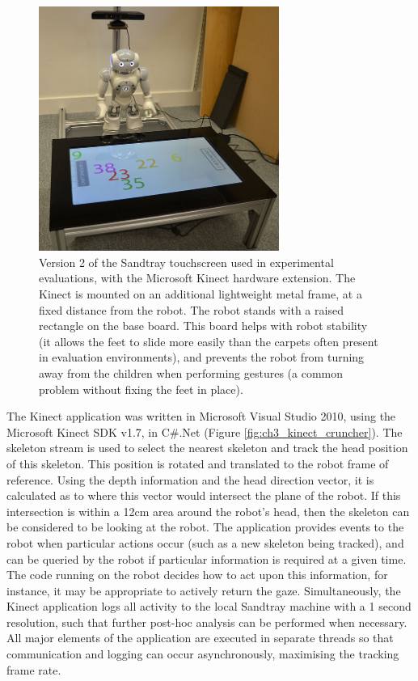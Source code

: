 \begin{figure}[ht]
   \centering
   \includegraphics[width=0.7\textwidth]{images/ch3_sandtray_kinect.jpg}
   \caption{Version 2 of the Sandtray touchscreen used in experimental evaluations, with the Microsoft Kinect hardware extension. The Kinect is mounted on an additional lightweight metal frame, at a fixed distance from the robot. The robot stands with a raised rectangle on the base board. This board helps with robot stability (it allows the feet to slide more easily than the carpets often present in evaluation environments), and prevents the robot from turning away from the children when performing gestures (a common problem without fixing the feet in place).}
   \label{fig:ch3_sandtray_kinect}
\end{figure}

The Kinect application was written in Microsoft Visual Studio 2010, using the Microsoft Kinect SDK v1.7, in C\#.Net (Figure \ref{fig:ch3_kinect_cruncher}). The skeleton stream is used to select the nearest skeleton and track the head position of this skeleton. This position is rotated and translated to the robot frame of reference. Using the depth information and the head direction vector, it is calculated as to where this vector would intersect the plane of the robot. If this intersection is within a 12cm area around the robot's head, then the skeleton can be considered to be looking at the robot. The application provides events to the robot when particular actions occur (such as a new skeleton being tracked), and can be queried by the robot if particular information is required at a given time. The code running on the robot decides how to act upon this information, for instance, it may be appropriate to actively return the gaze. Simultaneously, the Kinect application logs all activity to the local Sandtray machine with a 1 second resolution, such that further post-hoc analysis can be performed when necessary. All major elements of the application are executed in separate threads so that communication and logging can occur asynchronously, maximising the tracking frame rate.

